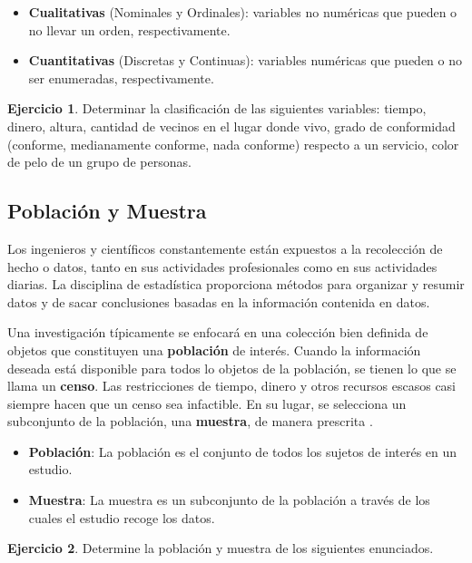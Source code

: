 \documentclass[
]{book}
\providecommand{\tightlist}{%
  \setlength{\itemsep}{0pt}\setlength{\parskip}{0pt}}
\theoremstyle{definition}
\theoremstyle{definition}
\theoremstyle{definition}
\newtheorem{exercise}{Ejercicio}[chapter]
\theoremstyle{definition}
\theoremstyle{remark}
\begin{document}
\begin{itemize}
\tightlist
\item
  \textbf{Cualitativas} (Nominales y Ordinales): variables no numéricas que pueden o no llevar un orden, respectivamente.
\item
  \textbf{Cuantitativas} (Discretas y Continuas): variables numéricas que pueden o no ser enumeradas, respectivamente.
\end{itemize}

\begin{exercise}
Determinar la clasificación de las siguientes variables: tiempo, dinero, altura, cantidad de vecinos en el lugar donde vivo, grado de conformidad (conforme, medianamente conforme, nada conforme) respecto a un servicio, color de pelo de un grupo de personas.
\end{exercise}

\hypertarget{poblaciuxf3n-y-muestra}{%
\subsection{Población y Muestra}\label{poblaciuxf3n-y-muestra}}

Los ingenieros y científicos constantemente están expuestos a la recolección de hecho o datos, tanto en sus actividades profesionales como en sus actividades diarias. La disciplina de estadística proporciona métodos para organizar y resumir datos y de sacar conclusiones basadas en la información contenida en datos.

Una investigación típicamente se enfocará en una colección bien definida de objetos que constituyen una \textbf{población} de interés. Cuando la información deseada está disponible para todos lo objetos de la población, se tienen lo que se llama un \textbf{censo}. Las restricciones de tiempo, dinero y otros recursos escasos casi siempre hacen que un censo sea infactible. En su lugar, se selecciona un subconjunto de la población, una \textbf{muestra}, de manera prescrita \citep[página 2]{Devore}.

\begin{itemize}
\tightlist
\item
  \textbf{Población}: La población es el conjunto de todos los sujetos de interés en un estudio.
\item
  \textbf{Muestra}: La muestra es un subconjunto de la población a través de los cuales el estudio recoge los datos.
\end{itemize}

\begin{exercise}
Determine la población y muestra de los siguientes enunciados.
\end{exercise}
\end{document}
